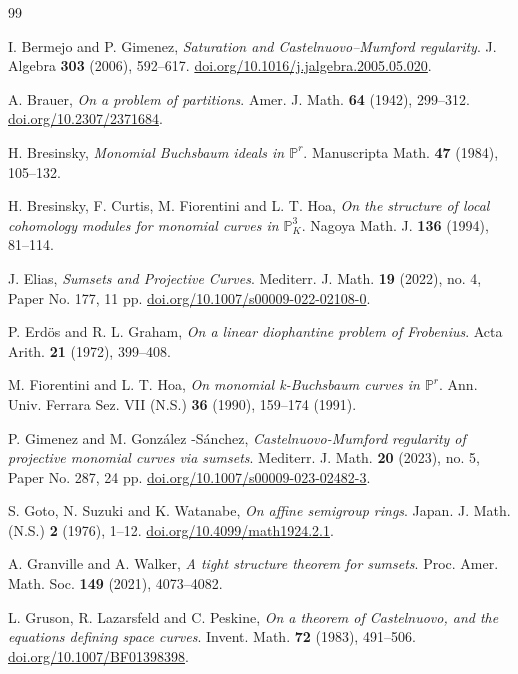 \documentclass[11pt]{article}
\def\Pset{{\mathbb P}}
\theoremstyle{remark}
\theoremstyle{definition}
\begin{document}
\begin{thebibliography}{99}

  I. Bermejo and P. Gimenez,  {\it Saturation and Castelnuovo--Mumford regularity}. J. Algebra {\bf 303} (2006), 592--617. \href{https://doi.org/10.1016/j.jalgebra.2005.05.020}{doi.org/10.1016/j.jalgebra.2005.05.020}.

  A. Brauer, {\it  On a problem of partitions}. Amer. J. Math. {\bf 64} (1942), 299--312. \href{https://doi.org/10.2307/2371684}{doi.org/10.2307/2371684}.

  H. Bresinsky, {\it  Monomial Buchsbaum ideals in $\Pset^r$}. Manuscripta Math. {\bf 47} (1984),  105--132. 
 
   H. Bresinsky, F. Curtis, M. Fiorentini and L. T.  Hoa, {\it  On the structure of local cohomology modules for monomial curves in $\Pset^3_K$}. Nagoya Math. J. {\bf 136} (1994), 81--114. 
 
  J. Elias, {\it Sumsets and Projective Curves}.  Mediterr. J. Math. {\bf 19} (2022), no. 4, Paper No. 177, 11 pp. \href{https://doi.org/10.1007/s00009-022-02108-0}{doi.org/10.1007/s00009-022-02108-0}.
  
  P. Erd\"os and R. L. Graham,  {\it On a linear diophantine problem of Frobenius}. Acta Arith. {\bf 21} (1972), 399--408.

 M. Fiorentini and L. T.  Hoa, {\it On monomial k-Buchsbaum curves in $\Pset^r$}.  Ann. Univ. Ferrara Sez. VII (N.S.) {\bf 36} (1990), 159--174 (1991).

  P. Gimenez and M.  Gonz\'alez -S\' anchez, {\it Castelnuovo-Mumford regularity of projective monomial curves via sumsets}. Mediterr. J. Math. {\bf 20} (2023), no. 5, Paper No. 287, 24 pp. \href{https://doi.org/10.1007/s00009-023-02482-3}{doi.org/10.1007/s00009-023-02482-3}.
 
  S.  Goto, N. Suzuki and K.  Watanabe, {\it  On affine semigroup rings}. Japan. J. Math. (N.S.) {\bf 2} (1976),  1--12. \href{https://doi.org/10.4099/math1924.2.1}{doi.org/10.4099/math1924.2.1}.

 	A. Granville and A. Walker, {\it A tight structure theorem for sumsets}.  Proc. Amer. Math. Soc. {\bf 149} (2021), 4073--4082. 
 
  L. Gruson, R. Lazarsfeld and C. Peskine, {\it On a theorem of Castelnuovo, and the equations defining space curves}. Invent. Math. {\bf 72} (1983),  491--506. \href{https://doi.org/10.1007/BF01398398}{doi.org/10.1007/BF01398398}.
 

\end{thebibliography}
\end{document}
